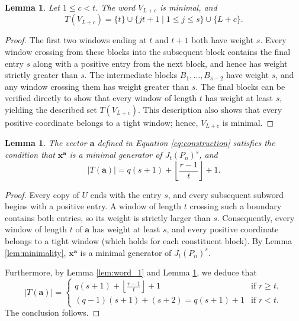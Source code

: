 \documentclass[12pt]{amsart}
\newtheorem{lemma}[theorem]{Lemma}
\theoremstyle{definition}
\theoremstyle{remark}
\numberwithin{equation}{section}
\begin{document}
\begin{lemma}\label{lem:words_2}
Let $1 \le c < t$. The word $V_{L+c}$ is minimal, and
\[
T(V_{L+c}) = \{t\} \cup \{jt + 1 \mid 1 \le j \le s\} \cup \{L + c\}.
\]
\end{lemma}

\begin{proof}
The first two windows ending at $t$ and $t+1$ both have weight $s$. Every window crossing from these blocks into the subsequent block contains the final entry $s$ along with a positive entry from the next block, and hence has weight strictly greater than $s$. The intermediate blocks $B_1, \ldots, B_{s-2}$ have weight $s$, and any window crossing them has weight greater than $s$. The final blocks can be verified directly to show that every window of length $t$ has weight at least $s$, yielding the described set $T(V_{L+c})$. This description also shows that every positive coordinate belongs to a tight window; hence, $V_{L+c}$ is minimal.
\end{proof}

\begin{lemma}\label{lem:construction_minimality}
The vector $\mathbf{a}$ defined in Equation \eqref{eq:construction} satisfies the condition that $\mathbf{x}^{\mathbf{a}}$ is a minimal generator of $J_t(P_n)^s$, and
\[
|T(\mathbf{a})| = q(s+1) + \left\lfloor \frac{r-1}{t} \right\rfloor + 1.
\]
\end{lemma}

\begin{proof}
Every copy of $U$ ends with the entry $s$, and every subsequent subword begins with a positive entry. A window of length $t$ crossing such a boundary contains both entries, so its weight is strictly larger than $s$. Consequently, every window of length $t$ of $\mathbf{a}$ has weight at least $s$, and every positive coordinate belongs to a tight window (which holds for each constituent block). By Lemma \ref{lem:minimality}, $\mathbf{x}^{\mathbf{a}}$ is a minimal generator of $J_t(P_n)^s$. 

Furthermore, by Lemma \ref{lem:word_1} and Lemma \ref{lem:words_2}, we deduce that
\[
|T(\mathbf{a})| = \begin{cases}
q(s+1) + \left\lfloor \frac{r-1}{t} \right\rfloor + 1 & \text{if } r \ge t, \\
(q-1)(s+1) + (s+2) = q(s+1) + 1 & \text{if } r < t.
\end{cases}
\]
The conclusion follows.
\end{proof}
\end{document}
